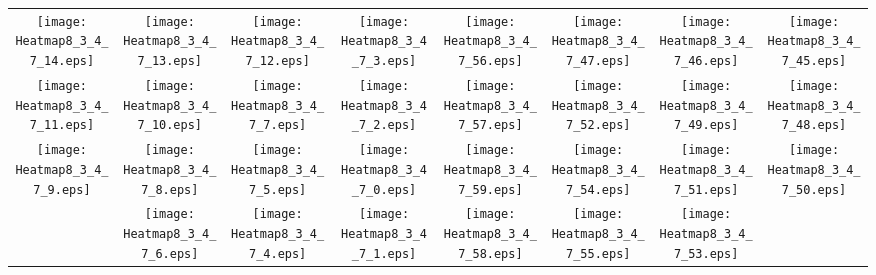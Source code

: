 \documentclass{standalone}
\begin{document}
\begin{tabular}{ *8{c} }
\texttt{[image: Heatmap8\_3\_4\_7\_14.eps]} & \texttt{[image: Heatmap8\_3\_4\_7\_13.eps]} & \texttt{[image: Heatmap8\_3\_4\_7\_12.eps]} & \texttt{[image: Heatmap8\_3\_4\_7\_3.eps]} & \texttt{[image: Heatmap8\_3\_4\_7\_56.eps]} & \texttt{[image: Heatmap8\_3\_4\_7\_47.eps]} & \texttt{[image: Heatmap8\_3\_4\_7\_46.eps]} & \texttt{[image: Heatmap8\_3\_4\_7\_45.eps]} \\
\texttt{[image: Heatmap8\_3\_4\_7\_11.eps]} & \texttt{[image: Heatmap8\_3\_4\_7\_10.eps]} & \texttt{[image: Heatmap8\_3\_4\_7\_7.eps]} & \texttt{[image: Heatmap8\_3\_4\_7\_2.eps]} & \texttt{[image: Heatmap8\_3\_4\_7\_57.eps]} & \texttt{[image: Heatmap8\_3\_4\_7\_52.eps]} & \texttt{[image: Heatmap8\_3\_4\_7\_49.eps]} & \texttt{[image: Heatmap8\_3\_4\_7\_48.eps]} \\
\texttt{[image: Heatmap8\_3\_4\_7\_9.eps]} & \texttt{[image: Heatmap8\_3\_4\_7\_8.eps]} & \texttt{[image: Heatmap8\_3\_4\_7\_5.eps]} & \texttt{[image: Heatmap8\_3\_4\_7\_0.eps]} & \texttt{[image: Heatmap8\_3\_4\_7\_59.eps]} & \texttt{[image: Heatmap8\_3\_4\_7\_54.eps]} & \texttt{[image: Heatmap8\_3\_4\_7\_51.eps]} & \texttt{[image: Heatmap8\_3\_4\_7\_50.eps]} \\
 & \texttt{[image: Heatmap8\_3\_4\_7\_6.eps]} & \texttt{[image: Heatmap8\_3\_4\_7\_4.eps]} & \texttt{[image: Heatmap8\_3\_4\_7\_1.eps]} & \texttt{[image: Heatmap8\_3\_4\_7\_58.eps]} & \texttt{[image: Heatmap8\_3\_4\_7\_55.eps]} & \texttt{[image: Heatmap8\_3\_4\_7\_53.eps]} &  
\end{tabular}
\end{document}
